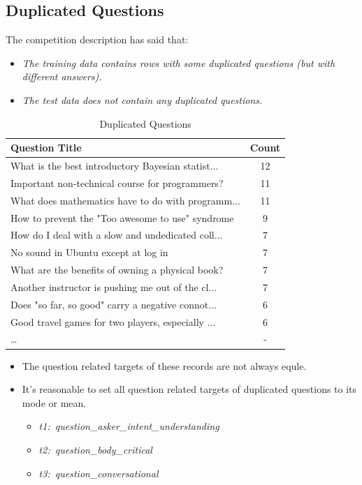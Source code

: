\subsection{Duplicated Questions}
The competition description has said that:
\begin{itemize}
    \item \emph{The training data contains rows with some duplicated questions (but with different answers). }
    \item \emph{The test data does not contain any duplicated questions.}
\end{itemize}
\begin{table}[htbp]  
    \centering
    \caption{Duplicated Questions}
    \label{tbl:dup_q}
    \begin{tabular}{lc}
        \hline
        Question Title & Count \\
        \hline
        What is the best introductory Bayesian statist...   &12\\
        Important non-technical course for programmers?	    &11\\
        What does mathematics have to do with programm...   &11\\
        How to prevent the "Too awesome to use" syndrome    & 9\\
        How do I deal with a slow and undedicated coll...   & 7\\
        No sound in Ubuntu except at log in	                & 7\\
        What are the benefits of owning a physical book?    & 7\\
        Another instructor is pushing me out of the cl...   & 7\\
        Does "so far, so good" carry a negative connot...   & 6\\
        Good travel games for two players, especially ...   & 6\\
        \dots&-\\
        \hline
    \end{tabular}
\end{table}
\begin{itemize}
    \item The question related targets of these records are not always equle.
    \item It's reasonable to set all question related targets of duplicated questions to its mode or mean.
    \begin{itemize}
        \item \emph{t1:\ question_asker_intent_understanding}
        \item \emph{t2:\ question_body_critical}
        \item \emph{t3:\ question_conversational}
    \end{itemize}
\end{itemize}

